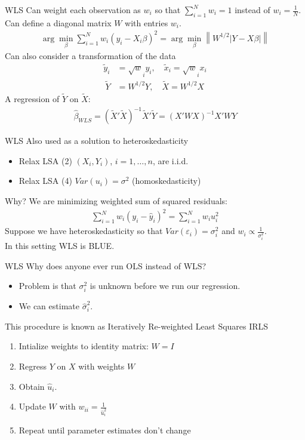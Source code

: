 \documentclass[aspectratio=169]{beamer}
\newcommand{\norm}[1]{\left\lVert#1\right\rVert}
\begin{document}
\begin{frame}{WLS}
Can weight each observation as $w_i$ so that $\sum_{i=1}^N w_i = 1$ instead of $w_i=\frac{1}{N}$.\\
Can define a diagonal matrix $W$ with entries $w_i$.
\begin{align*}
\arg \min_{\beta} \sum_{i=1}^N w_i (y_i - X_i \beta)^2 = \arg \min_{\beta} \norm{W^{1/2} \left|Y - X \beta \right| } 
\end{align*}
Can also consider a transformation of the data 
\begin{align*}
\tilde{y}_i &= \sqrt{w}_i y_i , \quad  \tilde{x}_i = \sqrt{w}_i x_i \\\
\tilde{Y} &= W^{1/2} Y, \quad  \tilde{X} = W^{1/2} X
\end{align*}
A regression of $\tilde{Y}$ on $\tilde{X}$:
\begin{align*}
\widehat{\beta}_{WLS} = (\tilde{X}'\tilde{X})^{-1}\tilde{X}'\tilde{Y} = (X' W X)^{-1} X' W Y
\end{align*}
\end{frame}

\begin{frame}{WLS}
Also used as a solution to heteroskedasticity
\begin{itemize}
    \item Relax LSA (2) $(X_i,Y_i)$, $i =1,\ldots,n$, are i.i.d.
    \item Relax LSA (4) $Var(u_i) = \sigma^2$ (homoskedasticity)
\end{itemize}
Why? We are minimizing weighted sum of squared residuals:
\begin{align*}
\sum_{i=1}^N w_i (y_i - \hat{y}_i)^2 = \sum_{i=1}^N w_i u_i^2 
\end{align*}
Suppose we have heteroskedasticity so that $Var(\varepsilon_i) = \sigma_i^2$ and $w_i \propto \frac{1}{\sigma_i^2}$.\\
In this setting WLS is \alert{BLUE}.
\end{frame}

\begin{frame}{WLS}
Why does anyone ever run OLS instead of WLS?
\begin{itemize}
\item Problem is that $\sigma_i^2$ is unknown before we run our regression.
\item We can estimate $\widehat{\sigma}_i^2$.
\end{itemize}
This procedure is known as Iteratively Re-weighted Least Squares \alert{IRLS}
\begin{enumerate}
\item Intialize weights to identity matrix: $W = I$
\item Regress $Y$ on $X$ with weights $W$
\item Obtain $\widehat{u}_i$.
\item Update $W$ with $w_{ii} = \frac{1}{\widehat{u}_i^2}$
\item Repeat until parameter estimates don't change
\end{enumerate}
\end{frame}
\end{document}
